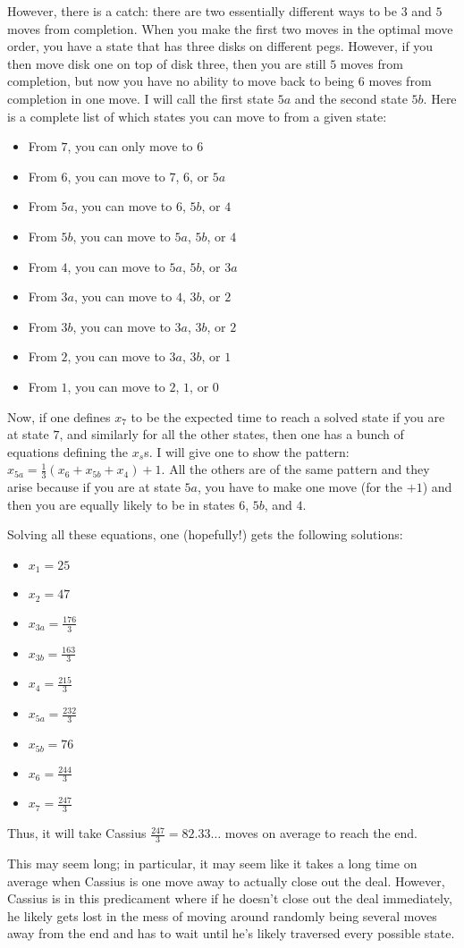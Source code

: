 \documentclass[11pt]{article}
\theoremstyle{definition}
\begin{document}
However, there is a catch: there are two essentially different ways to be $3$ and $5$ moves from completion.  When you make the first two moves in the optimal move order, you have a state that has three disks on different pegs.  However, if you then move disk one on top of disk three, then you are still $5$ moves from completion, but now you have no ability to move back to being $6$ moves from completion in one move.  I will call the first state $5a$ and the second state $5b$.  Here is a complete list of which states you can move to from a given state:
\begin{itemize}
\item From $7$, you can only move to $6$
\item From $6$, you can move to $7$, $6$, or $5a$
\item From $5a$, you can move to $6$, $5b$, or $4$
\item From $5b$, you can move to $5a$, $5b$, or $4$
\item From $4$, you can move to $5a$, $5b$, or $3a$
\item From $3a$, you can move to $4$, $3b$, or $2$
\item From $3b$, you can move to $3a$, $3b$, or $2$
\item From $2$, you can move to $3a$, $3b$, or $1$
\item From $1$, you can move to $2$, $1$, or $0$
\end{itemize}
Now, if one defines $x_7$ to be the expected time to reach a solved state if you are at state $7$, and similarly for all the other states, then one has a bunch of equations defining the $x_s$s.  I will give one to show the pattern: $x_{5a} = \frac{1}{3}(x_6 + x_{5b} + x_4) + 1$.  All the others are of the same pattern and they arise because if you are at state $5a$, you have to make one move (for the $+1$) and then you are equally likely to be in states $6$, $5b$, and $4$.

Solving all these equations, one (hopefully!) gets the following solutions:
\begin{itemize}
\item $x_1 = 25$
\item $x_2 = 47$
\item $x_{3a} = \frac{176}{3}$
\item $x_{3b} = \frac{163}{3}$
\item $x_4 = \frac{215}{3}$
\item $x_{5a} = \frac{232}{3}$
\item $x_{5b} = 76$
\item $x_6 = \frac{244}{3}$
\item $x_7 = \frac{247}{3}$
\end{itemize}
Thus, it will take Cassius $\frac{247}{3} = 82.33\ldots$ moves on average to reach the end.

This may seem long; in particular, it may seem like it takes a long time on average when Cassius is one move away to actually close out the deal.  However, Cassius is in this predicament where if he doesn't close out the deal immediately, he likely gets lost in the mess of moving around randomly being several moves away from the end and has to wait until he's likely traversed every possible state.
\end{document}
